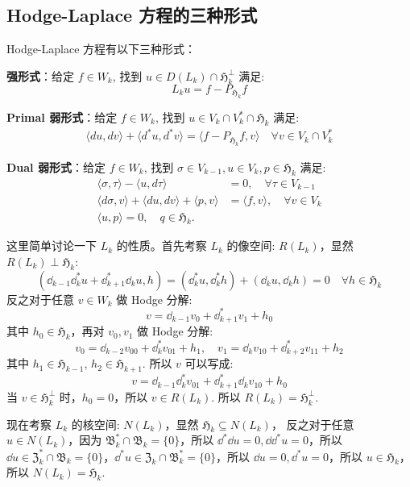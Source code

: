 \documentclass[lang=cn,a4paper,newtx]{elegantpaper}
\begin{document}
\subsection{Hodge-Laplace 方程的三种形式}
Hodge-Laplace 方程有以下三种形式：

\textbf{强形式}：给定 $f \in W_k$, 找到 $u \in D(L_k)\cap \mathfrak{H}_k^{\perp}$ 
满足:
$$
L_k u = f-P_{\mathfrak{H}_k} f
$$

\textbf{Primal 弱形式}：给定 $f \in W_k$, 找到 $u \in V_k\cap V_k^*\cap \mathfrak{H}_k$ 满足:
\begin{align}
\langle du,  dv\rangle + \langle d^* u, d^* v\rangle = \langle
f-P_{\mathfrak{H}_k} f, v\rangle \quad
\forall v \in V_k\cap V_k^*
\end{align}

\textbf{Dual 弱形式}：给定 $f \in W_k$, 找到 $\sigma \in V_{k-1}, u \in V_k, p
\in \mathfrak{H}_k$ 满足:
\begin{align}
    \langle \sigma,  \tau\rangle - \langle u, d \tau\rangle & = 0, \quad \forall \tau \in V_{k-1}\\
    \langle d\sigma,  v\rangle + \langle du,  dv\rangle + \langle p,  v\rangle &
    = \langle f, v\rangle, \quad \forall v \in V_k\\
    \langle u,  p\rangle = 0, \quad q \in \mathfrak{H}_k.
\end{align}

这里简单讨论一下 $L_k$ 的性质。首先考察 $L_k$ 的像空间: $R(L_k)$，显然 $R(L_k) \perp
\mathfrak{H}_k$:
$$
(\dd_{k-1} \dd_{k}^*u + \dd_{k+1}^* \dd_{k} u, h) = 
(\dd_{k}^*u, \dd_{k}^* h) + (\dd_{k} u, \dd_{k} h) = 0 \quad \forall h \in \mathfrak{H}_k
$$
反之对于任意 $v \in W_k$ 做 Hodge 分解:
$$
v = \dd_{k-1} v_0 + \dd_{k+1}^* v_1 + h_0
$$
其中 $h_0 \in \mathfrak{H}_k$，再对 $v_0, v_1$ 做 Hodge 分解:
$$
v_0 = \dd_{k-2} v_{00} + \dd_{k}^* v_{01} + h_1, \quad 
v_1 = \dd_{k} v_{10} + \dd_{k+2}^* v_{11} + h_2
$$
其中 $h_1 \in \mathfrak{H}_{k-1}$, $h_2 \in \mathfrak{H}_{k+1}$.
所以 $v$ 可以写成:
$$
v = \dd_{k-1} \dd_{k}^* v_{01} + 
\dd_{k+1}^* \dd_{k} v_{10} + h_0
$$
当 $v \in \mathfrak{H}_k^{\perp}$ 时，$h_0 = 0$，所以 $v \in R(L_k)$.
所以 $R(L_k) = \mathfrak{H}_k^{\perp}$.

现在考察 $L_k$ 的核空间: $N(L_k)$，显然 $\mathfrak{H}_k \subseteq N(L_k)$，
反之对于任意 $u \in N(L_k)$，因为 $\mathfrak{B}^*_k \cap \mathfrak{B}_k =
\{0\}$，所以 $\dd^* \dd u = 0, \dd \dd^* u = 0$，所以 $\dd u \in
\mathfrak{Z}_{k}^*\cap \mathfrak{B}_k = \{0\}$，$\dd^* u \in \mathfrak{Z}_{k}
\cap\mathfrak{B}_k^* = \{0\}$，所以 $\dd u = 0, \dd^* u = 0$，所以 $u \in 
\mathfrak{H}_k$，所以 $N(L_k) = \mathfrak{H}_k$.
\end{document}
